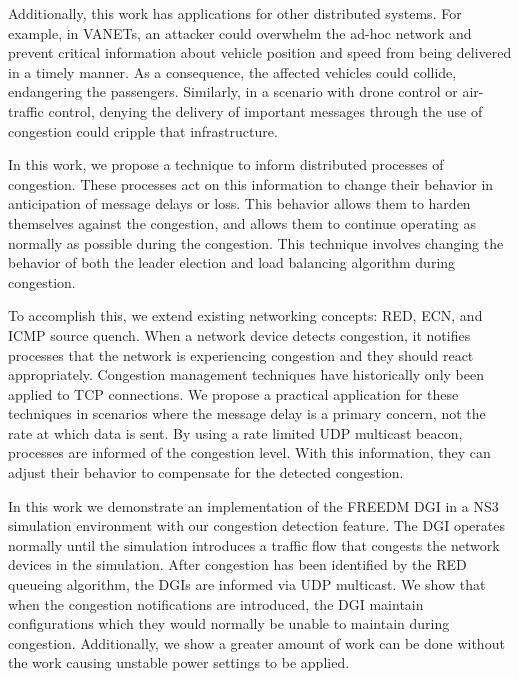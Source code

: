 Additionally, this work has applications for other distributed systems.
For example, in \ac{VANET}s\cite{CARS1}\cite{CARS2}, an attacker could overwhelm the ad-hoc network and prevent critical information about vehicle position and speed from being delivered in a timely manner.
As a consequence, the affected vehicles could collide, endangering the passengers.
Similarly, in a scenario with drone control or air-traffic control\cite{AIRTRAFFIC1}\cite{AIRTRAFFIC2}, denying the delivery of important messages through the use of congestion could cripple that infrastructure.

In this work, we propose a technique to inform distributed processes of congestion.
These processes act on this information to change their behavior in anticipation of message delays or loss.
This behavior allows them to harden themselves against the congestion, and allows them to continue operating as normally as possible during the congestion.
This technique involves changing the behavior of both the leader election and load balancing algorithm during congestion.

To accomplish this, we extend existing networking concepts: \ac{RED}, \ac{ECN}\cite{RFCECN}, and ICMP source quench\cite{RFCSOURCEQUENCH}.
When a network device detects congestion, it notifies processes that the network is experiencing congestion and they should react appropriately.
Congestion management techniques have historically only been applied to TCP connections.
We propose a practical application for these techniques in scenarios where the message delay is a primary concern, not the rate at which data is sent.
By using a rate limited UDP multicast beacon, processes are informed of the congestion level.
With this information, they can adjust their behavior to compensate for the detected congestion.

In this work we demonstrate an implementation of the \ac{FREEDM} \ac{DGI} in a \ac{NS3} simulation environment\cite{NS3} with our congestion detection feature.
The \ac{DGI} operates normally until the simulation introduces a traffic flow that congests the network devices in the simulation.
After congestion has been identified by the \ac{RED} queueing algorithm, the \ac{DGI}s are informed via UDP multicast.
We show that when the congestion notifications are introduced, the \ac{DGI} maintain configurations which they would normally be unable to maintain during congestion.
Additionally, we show a greater amount of work can be done without the work causing unstable power settings to be applied.
